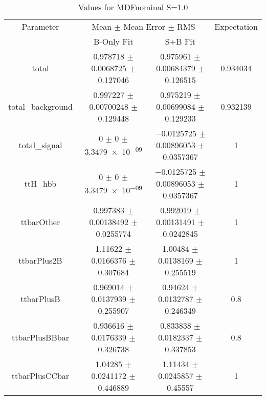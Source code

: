 \begin{table}
\centering
\caption{Values for MDFnominal S=1.0}
\begin{tabular}{cccc}
\toprule
Parameter & \multicolumn{2}{c}{Mean $\pm$ Mean Error $\pm$ RMS} & Expectation\\
 & B-Only Fit & S+B Fit & \\
\midrule
total & \num{0.978718} $\pm$ \num{0.0068725} $\pm$ \num{0.127046} & \num{0.975961} $\pm$ \num{0.00684379} $\pm$ \num{0.126515} & \num{0.934034}\\
total\_background & \num{0.997227} $\pm$ \num{0.00700248} $\pm$ \num{0.129448} & \num{0.975219} $\pm$ \num{0.00699084} $\pm$ \num{0.129233} & \num{0.932139}\\
total\_signal & \num{0} $\pm$ \num{0} $\pm$ \num{3.3479e-09} & \num{-0.0125725} $\pm$ \num{0.00896053} $\pm$ \num{0.0357367} & \num{1}\\
ttH\_hbb & \num{0} $\pm$ \num{0} $\pm$ \num{3.3479e-09} & \num{-0.0125725} $\pm$ \num{0.00896053} $\pm$ \num{0.0357367} & \num{1}\\
ttbarOther & \num{0.997383} $\pm$ \num{0.00138492} $\pm$ \num{0.0255774} & \num{0.992019} $\pm$ \num{0.00131491} $\pm$ \num{0.0242845} & \num{1}\\
ttbarPlus2B & \num{1.11622} $\pm$ \num{0.0166376} $\pm$ \num{0.307684} & \num{1.00484} $\pm$ \num{0.0138169} $\pm$ \num{0.255519} & \num{1}\\
ttbarPlusB & \num{0.969014} $\pm$ \num{0.0137939} $\pm$ \num{0.255907} & \num{0.94624} $\pm$ \num{0.0132787} $\pm$ \num{0.246349} & \num{0.8}\\
ttbarPlusBBbar & \num{0.936616} $\pm$ \num{0.0176339} $\pm$ \num{0.326738} & \num{0.833838} $\pm$ \num{0.0182337} $\pm$ \num{0.337853} & \num{0.8}\\
ttbarPlusCCbar & \num{1.04285} $\pm$ \num{0.0241172} $\pm$ \num{0.446889} & \num{1.11434} $\pm$ \num{0.0245857} $\pm$ \num{0.45557} & \num{1}\\
\bottomrule
\end{tabular}
\end{table}